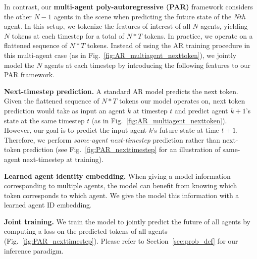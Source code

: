 In contrast, our \textbf{multi-agent poly-autoregressive (PAR)} framework considers the other $N-1$ agents in the scene when predicting the future state of the $Nth$ agent. In this setup, we tokenize the features of interest of all $N$ agents, yielding $N$ tokens at each timestep for a total of $N*T$ tokens. In practice, we operate on a flattened sequence of $N*T$ tokens. 
Instead of using the AR training procedure in this multi-agent case (as in Fig.~\ref{fig:AR_multiagent_nexttoken}), we jointly model the $N$ agents at each timestep by introducing the following features to our PAR framework.

\vspace{0.2cm}
\noindent \textbf{Next-timestep prediction.} 
A standard AR model predicts the next token. Given the flattened sequence of $N*T$ tokens our model operates on, next token prediction would take as input an agent $k$ at timestep $t$ and predict agent $k+1$'s state at the same timestep $t$ (as in Fig.~\ref{fig:AR_multiagent_nexttoken}). However, our goal is to predict the input agent $k$'s future state at time $t+1$. Therefore, we perform \textit{same-agent next-timestep} prediction rather than next-token prediction (see Fig.~\ref{fig:PAR_nexttimestep} for an illustration of same-agent next-timestep at training).

\medskip \noindent \textbf{Learned agent identity embedding.} When giving a model information corresponding to multiple agents, the model can benefit from knowing which token corresponds to which agent. We give the model this information with a learned agent ID embedding. 
 




\medskip \noindent \textbf{Joint training.} We train the model to jointly predict the future of all agents by computing a loss on the predicted tokens of all agents (Fig.~\ref{fig:PAR_nexttimestep}). Please refer to Section~\ref{sec:prob_def} for our inference paradigm.

